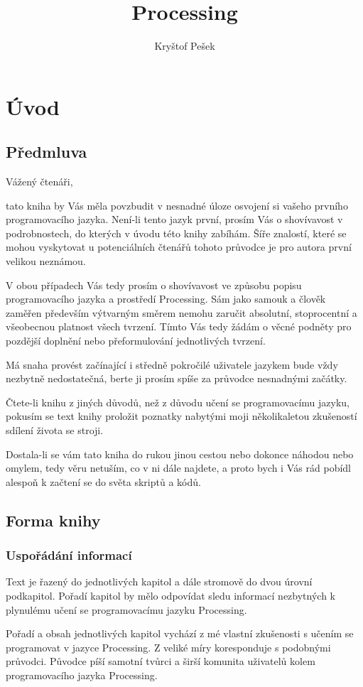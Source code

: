 \documentclass[10pt,twopage]{book}
\title{Processing}
\author{Kryštof Pešek}
\date{} %
\newcommand{\oddil}[1]{\section{#1}\label{sec:#1}}
\newcommand{\pododdil}[1]{\subsection{#1}\label{subsec:#1}}
\begin{document}

\tableofcontents


\chapter{Úvod}



\vfill
\thispagestyle{empty}


\oddil{Předmluva}




Vážený čtenáři,

tato kniha by Vás měla povzbudit v nesnadné úloze osvojení si vašeho prvního programovacího jazyka. Není-li tento jazyk první, prosím Vás o shovívavost v podrobnostech, do kterých v úvodu této knihy zabíhám. Šíře znalostí, které se mohou vyskytovat u potenciálních čtenářů tohoto průvodce je pro autora první velikou neznámou.

V obou případech Vás tedy prosím o shovívavost ve způsobu popisu programovacího jazyka a prostředí Processing. Sám jako samouk a člověk zaměřen především výtvarným směrem nemohu zaručit absolutní, stoprocentní a všeobecnou platnost všech tvrzení. Tímto Vás tedy žádám o věcné podněty pro pozdější doplnění nebo přeformulování jednotlivých tvrzení.

Má snaha provést začínající i středně pokročilé uživatele jazykem bude vždy nezbytně nedostatečná, berte ji prosím spíše za průvodce nesnadnými začátky.

Čtete-li knihu z jiných důvodů, než z důvodu učení se programovacímu jazyku, pokusím se text knihy proložit poznatky nabytými moji několikaletou zkušeností sdílení života se stroji.

Dostala-li se vám tato kniha do rukou jinou cestou nebo dokonce náhodou nebo omylem, tedy věru netuším, co v ni dále najdete, a proto bych i Vás rád pobídl alespoň k začtení se do světa skriptů a kódů.

\oddil{Forma knihy}

\pododdil{Uspořádání informací}

Text je řazený do jednotlivých  kapitol a dále stromově do dvou úrovní podkapitol. Pořadí kapitol by mělo odpovídat sledu informací nezbytných k plynulému učení se programovacímu jazyku Processing.

Pořadí a obsah jednotlivých kapitol vychází z mé vlastní zkušenosti s učením se programovat v jazyce Processing. Z veliké míry koresponduje s podobnými průvodci. Původce píší samotní tvůrci a širší komunita uživatelů kolem programovacího jazyka Processing.
\end{document}
